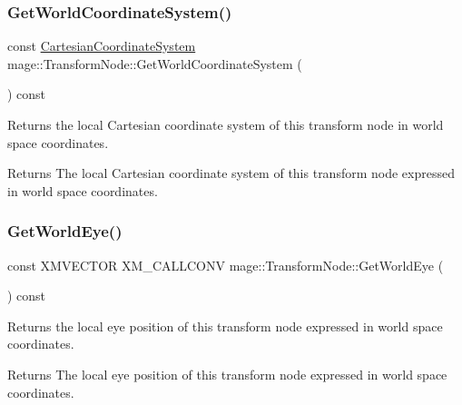 \subsubsection{\texorpdfstring{Get\+World\+Coordinate\+System()}{GetWorldCoordinateSystem()}}
{\footnotesize\ttfamily const \hyperlink{structmage_1_1_cartesian_coordinate_system}{Cartesian\+Coordinate\+System} mage\+::\+Transform\+Node\+::\+Get\+World\+Coordinate\+System (\begin{DoxyParamCaption}{ }\end{DoxyParamCaption}) const\hspace{0.3cm}{\ttfamily [noexcept]}}

Returns the local Cartesian coordinate system of this transform node in world space coordinates.

\begin{DoxyReturn}{Returns}
The local Cartesian coordinate system of this transform node expressed in world space coordinates. 
\end{DoxyReturn}
\hypertarget{classmage_1_1_transform_node_a6263c16d3dd3f7dd4bd7ba8c01f82a9a}{}\label{classmage_1_1_transform_node_a6263c16d3dd3f7dd4bd7ba8c01f82a9a} 
\subsubsection{\texorpdfstring{Get\+World\+Eye()}{GetWorldEye()}}
{\footnotesize\ttfamily const X\+M\+V\+E\+C\+T\+OR X\+M\+\_\+\+C\+A\+L\+L\+C\+O\+NV mage\+::\+Transform\+Node\+::\+Get\+World\+Eye (\begin{DoxyParamCaption}{ }\end{DoxyParamCaption}) const\hspace{0.3cm}{\ttfamily [noexcept]}}

Returns the local eye position of this transform node expressed in world space coordinates.

\begin{DoxyReturn}{Returns}
The local eye position of this transform node expressed in world space coordinates. 
\end{DoxyReturn}
\hypertarget{classmage_1_1_transform_node_a3127ed33bacba53bf452faae0dac8a4f}{}\label{classmage_1_1_transform_node_a3127ed33bacba53bf452faae0dac8a4f} 
